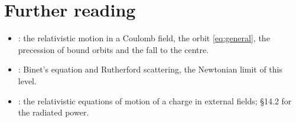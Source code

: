 \documentclass{leveldoc}
\begin{document}
\section{Further reading}\label{sec:reading}

\begin{itemize}
  \item {}: the relativistic motion in a Coulomb field, the orbit
    \eqref{eq:general}, the precession of bound orbits and the fall to the centre.
  \item {}: Binet's equation and Rutherford scattering, the Newtonian
    limit of this level.
  \item {}: the relativistic equations of motion of a charge in external fields;
    §14.2 for the radiated power.
\end{itemize}

\levelfileappendix
\end{document}
